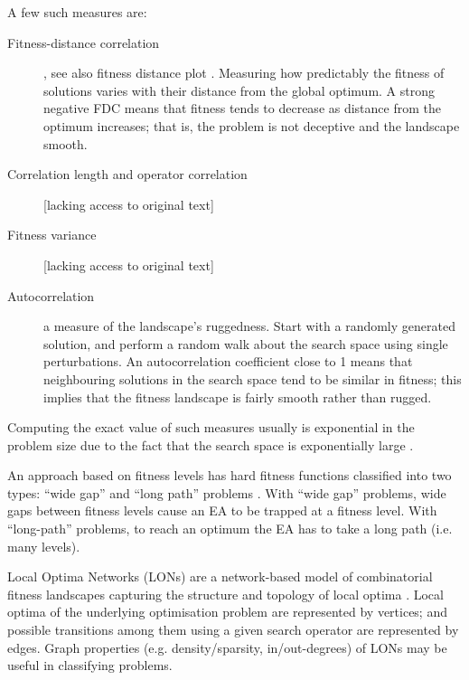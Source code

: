 \documentclass[a4paper]{article}
\begin{document}
A few such measures are:
\begin{description}
	\item[Fitness-distance correlation] \cite{Jones1995}, see also fitness distance plot \cite{Hoos2005}. Measuring how predictably the fitness of solutions varies with their distance from the global optimum. A strong negative FDC means that fitness tends to decrease as distance from the optimum increases; that is, the problem is not deceptive and the landscape smooth.
	\item[Correlation length and operator correlation] \cite{Manderick1991} [lacking access to original text]
	\item[Fitness variance] \cite{Radcliffe1994} [lacking access to original text]
	\item[Autocorrelation] \cite{Hoos2005} a measure of the landscape's ruggedness. Start with a randomly generated solution, and perform a random walk about the search space using single perturbations. An autocorrelation coefficient close to 1 means that neighbouring solutions in the search space tend to be similar in fitness; this implies that the fitness landscape is fairly smooth rather than rugged.
\end{description}

Computing the exact value of such measures usually is exponential in the problem size due to the fact that the search space is exponentially large \cite{Naudts2000,He2007,Jansen2001}.


An approach based on fitness levels has hard fitness functions classified into two types: ``wide gap'' and ``long path'' problems \cite{He2003}. With ``wide
gap'' problems, wide gaps between fitness levels cause an EA to be trapped at a fitness level. With ``long-path'' problems, to reach an optimum the EA has to take a long
path (i.e. many levels).

Local Optima Networks (LONs) are a network-based model of combinatorial fitness landscapes capturing the structure and topology of local optima \cite{Ochoa2015,Verel2011}.
Local optima of the underlying optimisation problem are represented by vertices; and possible transitions among them using a given search operator are represented by edges.
Graph properties (e.g. density/sparsity, in/out-degrees) of LONs may be useful in classifying problems.
\end{document}

